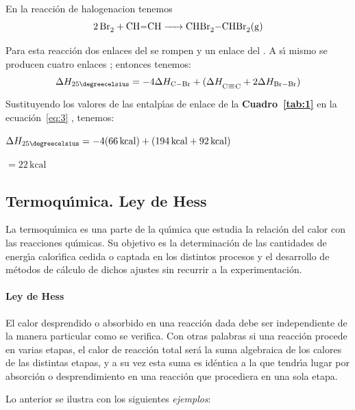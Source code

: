 \begin{example}
En la reacci\'on de \gls{halogenacion} 
tenemos
\begin{equation}
\ce{2Br2 + CH=CH ->  CHBr2-CHBr2(g)}
\end{equation}

Para esta reacci\'on dos enlaces  del  se rompen y un enlace  del . A s\'{\i} mismo se producen cuatro enlaces ; entonces tenemos:
\begin{equation}
\label{eq:3}
\Delta H_{25\degreecelsius} = - 4\Delta H_{\ce{C-Br}} 
+ (\Delta H_{\ce{C\bond{#}C} } + 2\Delta H_{\ce{Br-Br}})
\end{equation}
Sustituyendo los valores de las entalp\'{\i}as de enlace de la \textbf{Cuadro~\ref{tab:1}} en la e\-cua\-ci\'on~\ref{eq:3} , tenemos:

\hskip 1in   $\Delta H_{25\degreecelsius} = -4(66 \,\textrm{kcal}) + (194 \,\textrm{kcal} + 92 \,\textrm{kcal})$

\hskip 1.59in $= 22 \,\textrm{kcal}$
\end{example}

\subsection{Termoqu\'{\i}mica. Ley de Hess}

La termoqu\'{\i}mica es una parte de la qu\'{\i}mica que estudia la relaci\'on del calor con las reacciones qu\'{\i}micas. Su objetivo es
la determinaci\'on de las cantidades de energ\'{\i}a calor\'{\i}fica cedida o captada en los distintos procesos y el desarrollo de
m\'etodos de c\'alculo de dichos ajustes sin recurrir a la experimentaci\'on.

\paragraph{Ley de Hess} El calor desprendido o absorbido en una reacci\'on dada debe ser independiente de la manera particular como se verifica. Con otras palabras si una reacci\'on procede en varias etapas, el calor de reacci\'on total ser\'a la suma algebraica de los calores de las distintas etapas, y a su vez esta suma es id\'entica a la que tendr\'{\i}a lugar por absorci\'on o desprendimiento en una reacci\'on que procediera en una sola etapa.

Lo anterior se ilustra con los siguientes \textit{ejemplos}:

